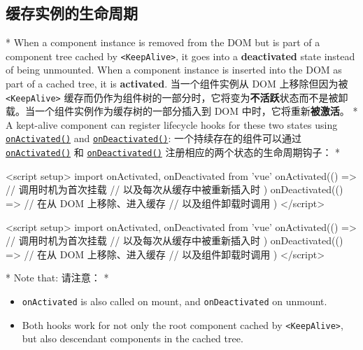 \begin{paracol}{2}
\subsection{缓存实例的生命周期}
\switchcolumn[0]*%
When a component instance is removed from the DOM but is part of a
component tree cached by \texttt{\textless{}KeepAlive\textgreater{}}, it
goes into a \textbf{deactivated} state instead of being unmounted. When
a component instance is inserted into the DOM as part of a cached tree,
it is \textbf{activated}.
\switchcolumn
当一个组件实例从 DOM 上移除但因为被
\texttt{\textless{}KeepAlive\textgreater{}}
缓存而仍作为组件树的一部分时，它将变为\textbf{不活跃}状态而不是被卸载。当一个组件实例作为缓存树的一部分插入到
DOM 中时，它将重新\textbf{被激活}。
\switchcolumn[0]*%
A kept-alive component can register lifecycle hooks for these two states
using
\href{https://vuejs.org/api/composition-api-lifecycle.html\#onactivated}{\texttt{onActivated()}}
and
\href{https://vuejs.org/api/composition-api-lifecycle.html\#ondeactivated}{\texttt{onDeactivated()}}:
\switchcolumn
一个持续存在的组件可以通过
\href{https://cn.vuejs.org/api/composition-api-lifecycle.html\#onactivated}{\texttt{onActivated()}}
和
\href{https://cn.vuejs.org/api/composition-api-lifecycle.html\#ondeactivated}{\texttt{onDeactivated()}}
注册相应的两个状态的生命周期钩子：
\switchcolumn[0]*%
\begin{codeHtml}
<script setup>
import { onActivated, onDeactivated } from 'vue'
onActivated(() => {
  // 调用时机为首次挂载
  // 以及每次从缓存中被重新插入时
})
onDeactivated(() => {
  // 在从 DOM 上移除、进入缓存
  // 以及组件卸载时调用
})
</script>
\end{codeHtml}
\switchcolumn
\begin{codeHtml}
<script setup>
import { onActivated, onDeactivated } from 'vue'
onActivated(() => {
  // 调用时机为首次挂载
  // 以及每次从缓存中被重新插入时
})
onDeactivated(() => {
  // 在从 DOM 上移除、进入缓存
  // 以及组件卸载时调用
})
</script>
\end{codeHtml}
\switchcolumn[0]*%
Note that:
\switchcolumn
请注意：
\switchcolumn[0]*%
\begin{itemize}
\item
  \texttt{onActivated} is also called on mount, and
  \texttt{onDeactivated} on unmount.
\item
  Both hooks work for not only the root component cached by
  \texttt{\textless{}KeepAlive\textgreater{}}, but also descendant
  components in the cached tree.
\end{itemize}

\end{paracol}
